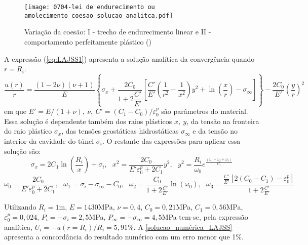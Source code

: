 \begin{figure}[H]
	\begin{center}
		\texttt{[image: 0704-lei de endurecimento ou amolecimento\_coesao\_solucao\_analitca.pdf]}
	\end{center}
	\caption{\label{coesao_solucao_analitca_LAJSS}Variação da coesão: I - trecho de endurecimento linear e II - comportamento perfeitamente plástico ()}
\end{figure}
A expressão (\ref{eq:LAJSS1}) apresenta a solução analítica da convergência quando $r=R_i$.
\begin{equation}
	\label{eq:LAJSS1}
	\dfrac{u(r)}{r} = \dfrac{(1-2\nu)(\nu+1)}{E}\left\{\sigma_x+\dfrac{2C_0}{1+2\dfrac{C'}{E'}}\left[\dfrac{C'}{E'}\left(\dfrac{1}{r^2}-\dfrac{1}{x^2}\right) y^2+\ln{\left(\dfrac{x}{r}\right)-\sigma_\infty} \right]  \right\}-\dfrac{2C_0}{E'}\left(\dfrac{y}{r}\right)^2
\end{equation}
em que $E'=E/(1+\nu),~\nu,~C' = (C_1-C_0)/\varepsilon_0^p$ são parâmetros do material. Essa solução é dependente também dos raios plásticos $x,~y$, da tensão na fronteira do raio plástico $\sigma_x$, das tensões geostáticas hidrostáticas $\sigma_\infty$ e da tensão no interior da cavidade do túnel $\sigma_i$. O restante das expressões para aplicar essa solução são:
\begin{equation} \label{eq:LAJSS2}
	{{\sigma }_{x}}=2{{C}_{1}}\ln \left( \frac{{{R}_{i}}}{x} \right)+{{\sigma }_{i}},~~~ 	{{x}^{2}}=\frac{2{{C}_{0}}}{E'\varepsilon _{0}^{p}+2{{C}_{1}}}{{y}^{2}}, ~~~ 	{{y}^{2}}=\frac{{{R}_{i}}}{{{\omega }_{0}}}{{e}^{\frac{({{\omega }_{1}}+{{\omega }_{2}}+{{\omega }_{3}})}{{{C}_{1}}}}} 
\end{equation}
\begin{equation} \label{eq:LAJSS3}
	{{\omega }_{0}}=\frac{2{{C}_{0}}}{E'\varepsilon _{0}^{p}+2{{C}_{1}}}, ~~~ 	{{\omega }_{1}}={{\sigma }_{i}}-{{\sigma }_{\infty }}-{{C}_{0}} , ~~~ {{\omega }_{2}}=\frac{{{C}_{0}}}{1+2\frac{C'}{E'}}\ln ({{\omega }_{0}}), ~~~ 	{{\omega }_{3}}=\frac{\frac{C'}{E'}\left[ 2({{C}_{0}}-{{C}_{1}})-\varepsilon _{0}^{p} \right]}{1+2\frac{C'}{E'}}
\end{equation}

Utilizando $R_i=1$m, $E=1430$MPa, $\nu = 0,4$, $C_0=0,21$MPa, $C_1=0,56$MPa, $\varepsilon _{0}^{p}=0,024$, $P_i = -\sigma_i = 2,5$MPa, $ P_\infty = -\sigma_\infty = 4,5$MPa tem-se, pela expressão analítica, $U_i = - u(r=R_i)/R_i = 5,91$\%. A \autoref{solucao_numérica_LAJSS} apresenta a concordância do resultado numérico com um erro menor que 1\%.

